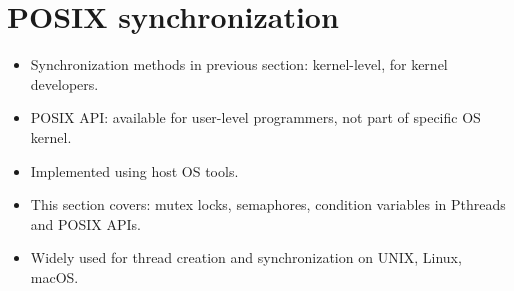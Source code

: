 \section{POSIX synchronization}

\begin{itemize}
    \item Synchronization methods in previous section: kernel-level, for kernel developers.
    \item POSIX API: available for user-level programmers, not part of specific OS kernel.
    \item Implemented using host OS tools.
    \item This section covers: mutex locks, semaphores, condition variables in Pthreads and POSIX APIs.
    \item Widely used for thread creation and synchronization on UNIX, Linux, macOS.
\end{itemize}

